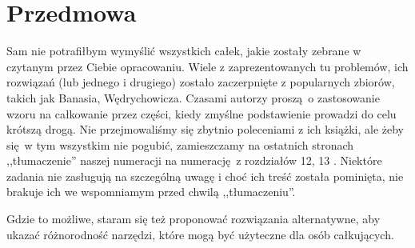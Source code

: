 

\tableofcontents

\chapter*{Przedmowa}
Sam nie potrafiłbym wymyślić wszystkich całek, jakie zostały zebrane w czytanym przez Ciebie opracowaniu.
Wiele z zaprezentowanych tu problemów, ich rozwiązań (lub jednego i drugiego) zostało zaczerpnięte z popularnych zbiorów, takich jak \cite{banas_wedrychowicz} Banasia, Wędrychowicza.
Czasami autorzy proszą o zastosowanie wzoru na całkowanie przez części, kiedy zmyślne podstawienie prowadzi do celu krótszą drogą.
Nie przejmowaliśmy się zbytnio poleceniami z ich książki, ale żeby się w tym wszystkim nie pogubić, zamieszczamy na ostatnich stronach ,,tłumaczenie'' naszej numeracji na numerację z rozdziałów 12, 13 \cite{banas_wedrychowicz}.
Niektóre zadania nie zasługują na szczególną uwagę i choć ich treść została pominięta, nie brakuje ich we wspomniamym przed chwilą ,,tłumaczeniu''.

Gdzie to możliwe, staram się też proponować rozwiązania alternatywne, aby ukazać różnorodność narzędzi, które mogą być użyteczne dla osób całkujących.


